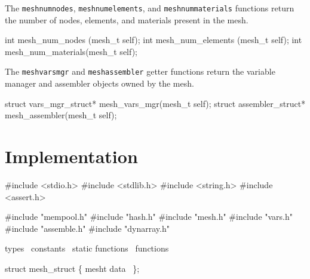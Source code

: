 \nwendcode{}\nwdocspar

The {\tt{}mesh{}num{}nodes}, {\tt{}mesh{}num{}elements}, and {\tt{}mesh{}num{}materials}
functions return the number of nodes, elements, and materials present
in the mesh.

\nwenddocs{}\plusendmoddef
int mesh_num_nodes    (mesh_t self);
int mesh_num_elements (mesh_t self);
int mesh_num_materials(mesh_t self);

\nwendcode{}\nwdocspar

The {\tt{}mesh{}vars{}mgr} and {\tt{}mesh{}assembler} getter functions return
the variable manager and assembler objects owned by the mesh.

\nwenddocs{}\plusendmoddef
struct vars_mgr_struct* mesh_vars_mgr(mesh_t self);
struct assembler_struct* mesh_assembler(mesh_t self);
\nwendcode{}\nwdocspar


\section{Implementation}

\nwenddocs{}\endmoddef
#include <stdio.h>
#include <stdlib.h>
#include <string.h>
#include <assert.h>

#include "mempool.h"
#include "hash.h"
#include "mesh.h"
#include "vars.h"
#include "assemble.h"
#include "dynarray.h"

\LA{}types~{\nwtagstyle{}}\RA{}
\LA{}constants~{\nwtagstyle{}}\RA{}
\LA{}static functions~{\nwtagstyle{}}\RA{}
\LA{}functions~{\nwtagstyle{}}\RA{}
\nwendcode{}\nwdocspar

\nwenddocs{}\endmoddef
struct mesh_struct \{
    \LA{}\code{}mesh{}t\edoc{} data~{\nwtagstyle{}}\RA{}
\};

